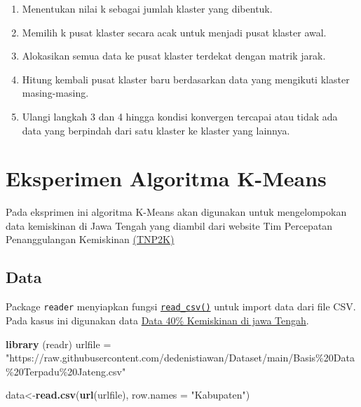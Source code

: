 \documentclass[
]{elegantbook}
\newenvironment{Shaded}{\begin{snugshade}}{\end{snugshade}}
\newcommand{\AttributeTok}[1]{\textcolor[rgb]{0.13,0.29,0.53}{#1}}
\newcommand{\FunctionTok}[1]{\textcolor[rgb]{0.13,0.29,0.53}{\textbf{#1}}}
\newcommand{\NormalTok}[1]{#1}
\newcommand{\OtherTok}[1]{\textcolor[rgb]{0.56,0.35,0.01}{#1}}
\newcommand{\StringTok}[1]{\textcolor[rgb]{0.31,0.60,0.02}{#1}}
\begin{document}
\begin{enumerate}
\def\labelenumi{\arabic{enumi}.}
\item
  Menentukan nilai k sebagai jumlah klaster yang dibentuk.
\item
  Memilih k pusat klaster secara acak untuk menjadi pusat klaster awal.
\item
  Alokasikan semua data ke pusat klaster terdekat dengan matrik jarak.
\item
  Hitung kembali pusat klaster baru berdasarkan data yang mengikuti klaster masing-masing.
\item
  Ulangi langkah 3 dan 4 hingga kondisi konvergen tercapai atau tidak ada data yang berpindah dari satu klaster ke klaster yang lainnya.
\end{enumerate}

\hypertarget{eksperimen-algoritma-k-means}{%
\section{Eksperimen Algoritma K-Means}\label{eksperimen-algoritma-k-means}}

Pada eksprimen ini algoritma K-Means akan digunakan untuk mengelompokan data kemiskinan di Jawa Tengah yang diambil dari website Tim Percepatan Penanggulangan Kemiskinan \href{https://www.tnp2k.go.id/}{(TNP2K)}

\hypertarget{data}{%
\subsection{Data}\label{data}}

Package \texttt{reader} menyiapkan fungsi \href{https://readr.tidyverse.org/reference/read_delim.html}{\texttt{read\_csv()}} untuk import data dari file CSV. Pada kasus ini digunakan data \href{https://github.com/dedenistiawan/Dataset/blob/main/BDT.csv}{Data 40\% Kemiskinan di jawa Tengah}.

\begin{Shaded}
\begin{Highlighting}[]
\FunctionTok{library}\NormalTok{ (readr)}
\NormalTok{urlfile }\OtherTok{=} \StringTok{"https://raw.githubusercontent.com/dedenistiawan/Dataset/main/Basis\%20Data\%20Terpadu\%20Jateng.csv"}

\NormalTok{data}\OtherTok{\textless{}{-}}\FunctionTok{read.csv}\NormalTok{(}\FunctionTok{url}\NormalTok{(urlfile), }\AttributeTok{row.names =} \StringTok{"Kabupaten"}\NormalTok{)}
\end{Highlighting}
\end{Shaded}
\end{document}
